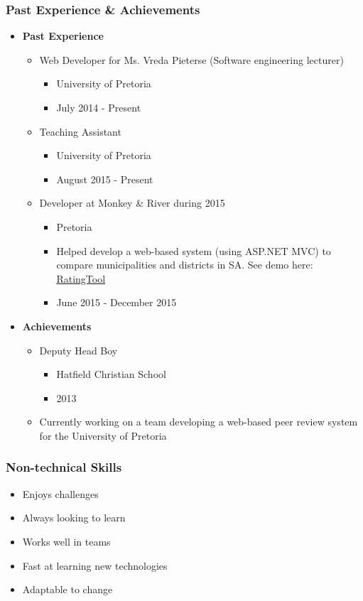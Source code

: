 \documentclass{article}
\begin{document}
\subsubsection{Past Experience \& Achievements}
\begin{itemize}
	\item \textbf{Past Experience}
	\begin{itemize}
		\item Web Developer for Ms. Vreda Pieterse (Software engineering lecturer)
		\begin{itemize}
			\item University of Pretoria
			\item July 2014 - Present
		\end{itemize}
		\item Teaching Assistant
		\begin{itemize}
			\item University of Pretoria
			\item August 2015 - Present
		\end{itemize}
		\item Developer at Monkey \& River during 2015
		\begin{itemize}
			\item Pretoria
			\item Helped develop a web-based system (using ASP.NET MVC) to compare municipalities and districts in SA. See demo here: \href{http://salgabarometerdemo.org.za/RatingTool}{RatingTool}
			\item June 2015 - December 2015
		\end{itemize}
	\end{itemize}
	
	\item \textbf{Achievements}
	\begin{itemize}
		\item Deputy Head Boy
		\begin{itemize}
			\item Hatfield Christian School
			\item 2013
		\end{itemize}
		\item Currently working on a team developing a web-based peer review system for the University of Pretoria
	\end{itemize}
\end{itemize}
\subsubsection{Non-technical Skills}
\begin{itemize}
	\item Enjoys challenges
	\item Always looking to learn
	\item Works well in teams
	\item Fast at learning new technologies
	\item Adaptable to change
\end{itemize}
\end{document}

